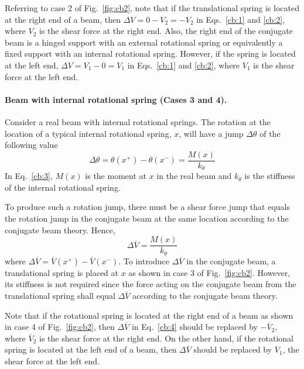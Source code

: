 Referring to case 2 of Fig.~\ref{fig:cb2}, note that if the translational spring is located at the right end of a beam, then $\Delta V = 0 - V_2 = -V_2$ in Eqs.~\eqref{cb:1} and \eqref{cb:2}, where $V_2$ is the shear force at the right end. Also, the right end of the conjugate beam is a hinged support with an external rotational spring or equivalently a fixed support with an internal rotational spring. However, if the spring is located at the left end, $\Delta V = V_1 - 0 = V_1$ in Eqs.~\eqref{cb:1} and \eqref{cb:2}, where $V_1$ is the shear force at the left end.

\paragraph{Beam with internal rotational spring (Cases 3 and 4).}
Consider a real beam with internal rotational springs. The rotation at the location of a typical internal rotational spring, $x$, will have a jump $\Delta\theta$ of the following value
\begin{equation}
  \Delta\theta = \theta(x^+) - \theta(x^-) = \frac{M(x)}{k_\theta} \tag{3}\label{cb:3}
\end{equation}
In Eq.~\eqref{cb:3}, $M(x)$ is the moment at $x$ in the real beam and $k_\theta$ is the stiffness of the internal rotational spring.

To produce such a rotation jump, there must be a shear force jump that equals the rotation jump in the conjugate beam at the same location according to the conjugate beam theory. Hence,
\begin{equation}
  \Delta\overline V = \frac{M(x)}{k_\theta} \tag{4}\label{cb:4}
\end{equation}
where $\Delta\overline V = \overline V(x^+) - \overline V(x^-)$. To introduce $\Delta\overline V$ in the conjugate beam, a translational spring is placed at $x$ as shown in case 3 of Fig.~\ref{fig:cb2}. However, its stiffness is not required since the force acting on the conjugate beam from the translational spring shall equal $\Delta\overline V$ according to the conjugate beam theory.

Note that if the rotational spring is located at the right end of a beam as shown in case 4 of Fig.~\ref{fig:cb2}, then $\Delta\overline V$ in Eq.~\eqref{cb:4} should be replaced by $-\overline V_2$, where $\overline V_2$ is the shear force at the right end. On the other hand, if the rotational spring is located at the left end of a beam, then $\Delta\overline V$ should be replaced by $\overline V_1$, the shear force at the left end.

